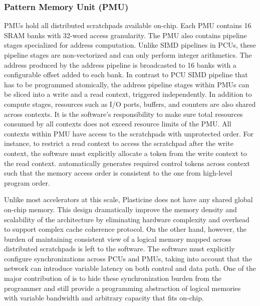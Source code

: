 \subsubsection{Pattern Memory Unit (PMU)}
PMUs hold all distributed scratchpads available on-chip. 
Each PMU contains 16 SRAM banks with
32-word access granularity. The PMU also contains pipeline stages specialized for address
computation. Unlike SIMD pipelines in PCUs, these pipeline stages are non-vectorized and can only 
perform integer arithmetics. 
The address produced by the address pipeline is broadcasted to 16 banks with a configurable offset added to each bank.
In contrast to PCU SIMD pipeline that has to be programmed atomically, the address pipeline stages 
within PMUs can be sliced into a write and a read context, triggered independently.
In addition to compute stages, resources such as I/O ports, buffers, and counters are also shared across contexts.
It is the software's responsibility to make sure total resources consumed by all
contexts does not exceed resource limits of the PMU.
All contexts within PMU have access to the scratchpads with unprotected order. For instance, to
restrict a read context to access the scratchpad after the write context, the software must explicitly allocate
a token from the write context to the read context.
\name automatically generates required control tokens across context such that the memory access order is
consistent to the one from high-level program order.

Unlike most accelerators at this scale, Plasticine does not have any shared global on-chip memory. 
This design dramatically improve the memory density and scalability of the architecture 
by eliminating hardware complexity and overhead to support complex cache coherence protocol.
On the other hand, however, the burden of maintaining consistent view of a logical memory mapped
across distributed scratchpads is left to the software.
The software must explicitly configure synchronizations across PCUs and PMUs, taking into account
that the network can introduce variable latency on both control and data path.
One of the major contribution of \name is to hide these synchronization burden from the programmer
and still provide a programming abstraction of logical memories with variable bandwidth and 
arbitrary capacity that fits on-chip.

